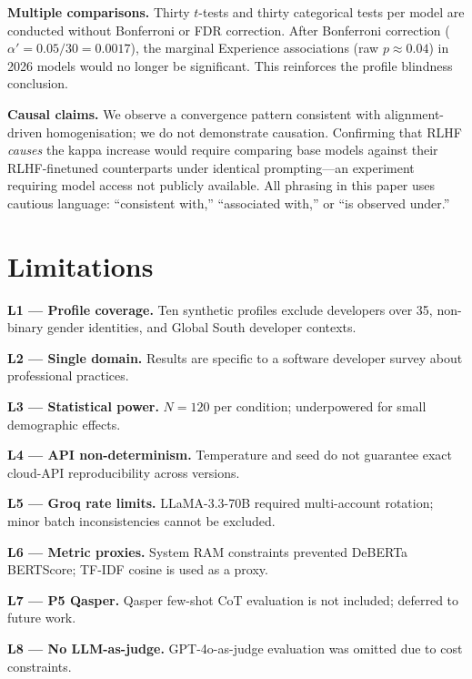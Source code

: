\documentclass[12pt,a4paper]{article}
\begin{document}
\textbf{Multiple comparisons.}
Thirty $t$-tests and thirty categorical tests per model are conducted
without Bonferroni or FDR correction.
After Bonferroni correction
($\alpha' = 0.05/30 = 0.0017$), the
marginal Experience associations (raw $p \approx 0.04$) in 2026 models
would no longer be significant.
This reinforces the profile blindness conclusion.

\textbf{Causal claims.}
We observe a convergence pattern consistent with alignment-driven
homogenisation; we do not demonstrate causation.
Confirming that RLHF \emph{causes} the kappa increase would require
comparing base models against their RLHF-finetuned counterparts under
identical prompting---an experiment requiring model access not publicly
available.
All phrasing in this paper uses cautious language:
``consistent with,'' ``associated with,'' or ``is observed under.''

\section{Limitations}
\label{sec:limitations}

\noindent\textbf{L1 --- Profile coverage.}
Ten synthetic profiles exclude developers over 35, non-binary gender
identities, and Global South developer contexts.

\noindent\textbf{L2 --- Single domain.}
Results are specific to a software developer survey about professional
practices.

\noindent\textbf{L3 --- Statistical power.}
$N{=}120$ per condition; underpowered for small demographic effects.

\noindent\textbf{L4 --- API non-determinism.}
Temperature and seed do not guarantee exact cloud-API reproducibility
across versions.

\noindent\textbf{L5 --- Groq rate limits.}
LLaMA-3.3-70B required multi-account rotation; minor batch inconsistencies
cannot be excluded.

\noindent\textbf{L6 --- Metric proxies.}
System RAM constraints prevented DeBERTa BERTScore; TF-IDF cosine is
used as a proxy.

\noindent\textbf{L7 --- P5 Qasper.}
Qasper few-shot CoT evaluation is not included; deferred to future work.

\noindent\textbf{L8 --- No LLM-as-judge.}
GPT-4o-as-judge evaluation was omitted due to cost constraints.
\end{document}
